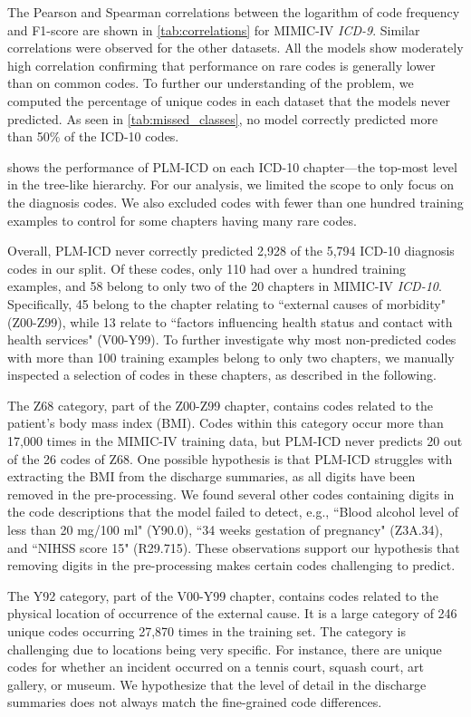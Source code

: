 {The Pearson and Spearman correlations between the logarithm of code frequency and F1-score are shown in \cref{tab:correlations} for MIMIC-IV \textit{ICD-9}. Similar correlations were observed for the other datasets. All the models show moderately high correlation confirming that performance on rare codes is generally lower than on common codes. To further our understanding of the problem, we computed the percentage of unique codes in each dataset that the models never predicted. As seen in \cref{tab:missed_classes}, no model correctly predicted more than 50\% of the ICD-10 codes.

 shows the performance of PLM-ICD on each ICD-10 chapter---the top-most level in the tree-like hierarchy. 
For our analysis, we limited the scope to only focus on the diagnosis codes. We also excluded codes with fewer than one hundred training examples to control for some chapters having many rare codes. 

Overall, PLM-ICD never correctly predicted 2,928 of the 5,794 ICD-10 diagnosis codes in our split. Of these codes, only 110 had over a hundred training examples, and 58 belong to only two of the 20 chapters in MIMIC-IV \textit{ICD-10}. Specifically, 45 belong to the chapter relating to ``external causes of morbidity" (Z00-Z99), while 13 relate to ``factors influencing health status and contact with health services" (V00-Y99). To further investigate why most non-predicted codes with more than 100 training examples belong to only two chapters, we manually inspected a selection of codes in these chapters, as described in the following.

The Z68 category, part of the Z00-Z99 chapter, contains codes related to the patient's body mass index (BMI). Codes within this category occur more than 17,000 times in the MIMIC-IV training data, but PLM-ICD never predicts 20 out of the 26 codes of Z68. One possible hypothesis is that PLM-ICD struggles with extracting the BMI from the discharge summaries, as all digits have been removed in the pre-processing. We found several other codes containing digits in the code descriptions that the model failed to detect, e.g., ``Blood alcohol level of less than 20 mg/100 ml" (Y90.0), ``34 weeks gestation of pregnancy" (Z3A.34), and ``NIHSS score 15" (R29.715). These observations support our hypothesis that removing digits in the pre-processing makes certain codes challenging to predict.

The Y92 category, part of the V00-Y99 chapter, contains codes related to the physical location of occurrence of the external cause. It is a large category of 246 unique codes occurring 27,870 times in the training set. The category is challenging due to locations being very specific. For instance, there are unique codes for whether an incident occurred on a tennis court, squash court, art gallery, or museum. We hypothesize that the level of detail in the discharge summaries does not always match the fine-grained code differences.

}
